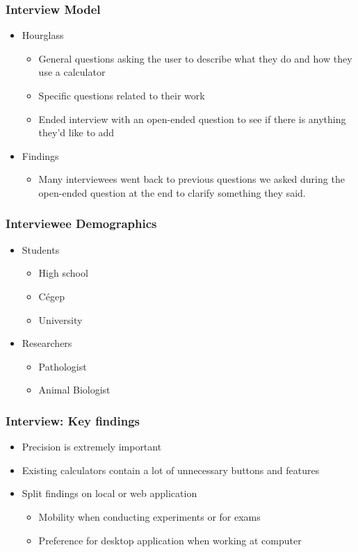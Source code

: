 \documentclass{beamer}
\begin{document}
\begin{frame}
\frametitle{Interview Model}
\begin{itemize}
 \item Hourglass
  \begin{itemize}
   \item General questions asking the user to describe what they do and how they use a calculator
   \item Specific questions related to their work
   \item Ended interview with an open-ended question to see if there is anything they'd like to add
  \end{itemize}
 \item Findings
  \begin{itemize}
   \item Many interviewees went back to previous questions we asked during the open-ended question at the end to clarify something they said.
  \end{itemize}
\end{itemize}
\end{frame}


\begin{frame}
\frametitle{Interviewee Demographics}
\begin{itemize}
 \item Students
  \begin{itemize}
   \item High school
   \item Cégep
   \item University
  \end{itemize}
 \item Researchers
\begin{itemize}
 \item Pathologist
    \item Animal Biologist
  \end{itemize}
\end{itemize}
\end{frame}


\begin{frame}
\frametitle{Interview: Key findings}
\begin{itemize}
 \item Precision is extremely important
 \item Existing calculators contain a lot of unnecessary buttons and features
 \item Split findings on local or web application
  \begin{itemize}
   \item Mobility when conducting experiments or for exams
   \item Preference for desktop application when working at computer
  \end{itemize}
\end{itemize}
\end{frame}
\end{document}
